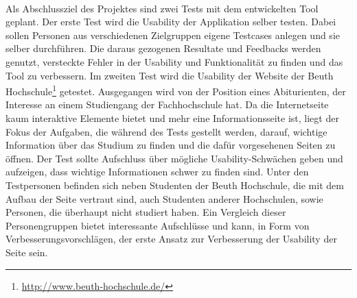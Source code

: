 \\
Als Abschlussziel des Projektes sind zwei Tests mit dem entwickelten Tool geplant. Der erste Test wird die Usability der Applikation selber testen. Dabei sollen Personen aus verschiedenen Zielgruppen eigene Testcases anlegen und sie selber durchführen. Die daraus gezogenen Resultate und Feedbacks werden genutzt, versteckte Fehler in der Usability und Funktionalität zu finden und das Tool zu verbessern. Im zweiten Test wird die Usability der Website der Beuth Hochschule\footnote{\url{http://www.beuth-hochschule.de/}} getestet. Ausgegangen wird von der Position eines Abiturienten, der Interesse an einem Studiengang der Fachhochschule hat. Da die Internetseite kaum interaktive Elemente bietet und mehr eine Informationsseite ist, liegt der Fokus der Aufgaben, die während des Tests gestellt werden, darauf, wichtige Information über das Studium zu finden und die dafür vorgesehenen Seiten zu öffnen. Der Test sollte Aufschluss über mögliche Usability-Schwächen geben und aufzeigen, dass wichtige Informationen schwer zu finden sind. Unter den Testpersonen befinden sich neben Studenten der Beuth Hochschule, die mit dem Aufbau der Seite vertraut sind, auch Studenten anderer Hochschulen, sowie Personen, die überhaupt nicht studiert haben. Ein Vergleich dieser Personengruppen bietet interessante Aufschlüsse und kann, in Form von Verbesserungsvorschlägen, der erste Ansatz zur Verbesserung der Usability der Seite sein.